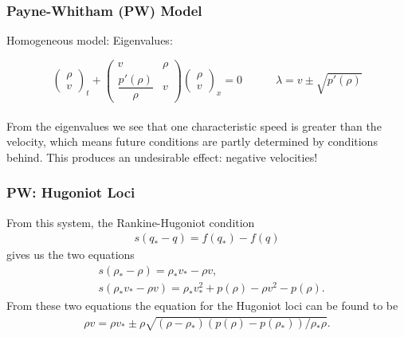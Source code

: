 \documentclass{beamer}
\begin{document}
\begin{frame}
\frametitle{Payne-Whitham (PW) Model}

\hspace{5em} Homogeneous model: \hspace{7em} Eigenvalues:

\[ \begin{pmatrix} \rho \\[1ex] v \end{pmatrix}_t + \begin{pmatrix} v & \rho \\[1ex] \dfrac{p'(\rho)}{\rho} & v\end{pmatrix} \begin{pmatrix} \rho \\[1ex] v \end{pmatrix}_x = 0 \hspace{3em} \lambda = v \pm \sqrt{p'(\rho)} \] \\[5ex]

From the eigenvalues we see that one characteristic speed is greater than the velocity, which means future conditions are partly determined by conditions behind. This produces an undesirable effect: negative velocities!

\end{frame}



\begin{frame}
\frametitle{PW: Hugoniot Loci}
From this system, the Rankine-Hugoniot condition 
\begin{align*}
s(q_* - q ) = f(q_*)-f(q)
\end{align*}
gives us the two equations 
\begin{align*}
&s(\rho_* - \rho ) = \rho_*v_* - \rho v, \\
&s (\rho_*v_* - \rho v ) = \rho_*v_*^2 + p(\rho) - \rho v^2 - p(\rho).
\end{align*}
From these two equations
the equation for the Hugoniot loci can be found to be
\begin{align*}
\rho v = \rho v_* \pm \rho \sqrt{\left( \rho - \rho_*\right) \left( p(\rho ) - p(\rho_*)\right) / \rho_*\rho }.
\end{align*}

\end{frame}
\end{document}

